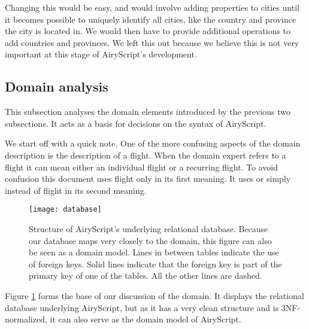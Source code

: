 Changing this would be easy, and would involve adding properties to cities
until it becomes possible to uniquely identify all cities, like the country
and province the city is located in.  We would then have to provide
additional operations to add countries and provinces. We left this out
because we believe this is not very important at this stage of AiryScript’s
development.


\subsection{Domain analysis}
\label{sec:domain_analysis}
This subsection analyses the domain elements introduced by the previous two
subsections. It acts as a basis for decisions on the syntax of AiryScript.

We start off with a quick note. One of the more confusing aspects of the domain
description is the description of a flight. When the domain expert refers to a
flight it can mean either an individual flight or a recurring flight. To avoid
confusion this document uses flight only in its first meaning. It uses
 or simply  instead of flight in its second
meaning.

\begin{figure}
  \def\svgwidth{\textwidth}
  \texttt{[image: database]}
  \caption{Structure of AiryScript’s underlying relational database. Because our
  database maps very closely to the domain, this figure can also be seen as a
domain model.
Lines in between tables indicate the use of foreign keys. Solid lines indicate
that the foreign key is part of the primary key of one of the tables. All the
other lines are dashed.}
  \label{fig:database}
\end{figure}

Figure \ref{fig:database} forms the base of our discussion of the domain. It
displays the relational database underlying AiryScript, but as it has a very
clean structure and is 3NF-normalized, it can also serve as the domain model of
AiryScript.

